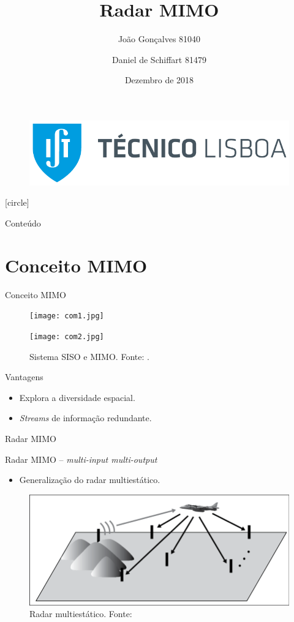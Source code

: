 \documentclass[portuguese]{beamer}
\title[Radar MIMO]{Radar MIMO}
\author[MEAer -- Sistemas de Radar]{
  João Gonçalves 81040 \and Daniel de Schiffart 81479
    }
\institute{Sistemas de Radar}
\date{Dezembro de 2018}
\begin{document}
\begin{frame}
    \begin{figure}
	\includegraphics[width=0.5\linewidth]{graphics/tecnico_logo.png}
    \end{figure}
    \titlepage
\end{frame}
[circle]
\begin{frame}{Conteúdo}
  \tableofcontents
\end{frame}

\section{Conceito MIMO}

\begin{frame}{Conceito MIMO}
  \begin{figure}[]
	\centering
	\begin{minipage}[t]{0.5\linewidth}
	  \centering
	  \texttt{[image: com1.jpg]}
    \end{minipage}%
    \begin{minipage}[t]{0.5\linewidth}	
	  \centering
	  \texttt{[image: com2.jpg]}
    \end{minipage}%
	\caption{Sistema SISO e MIMO. Fonte: \cite{swantennas}.}
	\label{fig:antenas}
  \end{figure}
  Vantagens
  \begin{itemize}
	\item Explora a diversidade espacial.
	\item \textit{Streams} de informação redundante.
  \end{itemize}
\end{frame}

\begin{frame}{Radar MIMO}
  \par
  {\large Radar MIMO -- \textit{multi-input multi-output}} 
  \begin{itemize}
	\item Generalização do radar multiestático.
  \end{itemize}
  \begin{figure}[]
	\centering
	\includegraphics[width=0.8\linewidth]{../report/graphics/multistatic.png}
	\caption{Radar multiestático. Fonte: \cite{mimoradarbook}}
	\label{fig:mono}
  \end{figure}
\end{frame}
\end{document}
